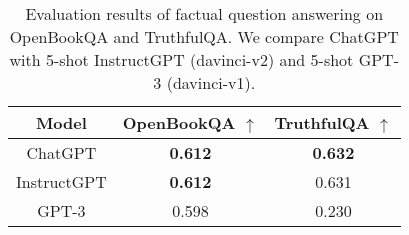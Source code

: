 \FloatBarrier
\begin{table}[!ht]
    \centering
    \begin{tabular}{ccc}
    \toprule
       Model  & OpenBookQA $\uparrow$& TruthfulQA $\uparrow$\\\midrule
       ChatGPT  &  \textbf{0.612} & \textbf{0.632}\\
       InstructGPT & \textbf{0.612} & 0.631\\
       GPT-3 & 0.598 & 0.230\\\bottomrule

    \end{tabular}
    \caption{Evaluation results of factual question answering on OpenBookQA and TruthfulQA. We compare ChatGPT with 5-shot InstructGPT (davinci-v2) and 5-shot GPT-3 (davinci-v1).}
    \label{tab:qa}
\end{table}
\FloatBarrier